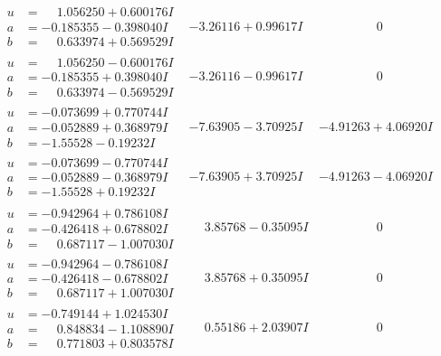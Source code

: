 \documentclass[1p]{elsarticle_modified}
\theoremstyle{definition}
\begin{document}
$$\begin{array}{c|c|c}
\begin{aligned}
u &= \phantom{-}1.056250 + 0.600176 I \\
a &= -0.185355 - 0.398040 I \\
b &= \phantom{-}0.633974 + 0.569529 I\end{aligned}
 & -3.26116 + 0.99617 I & \phantom{-0.000000 } 0 \\ \hline\begin{aligned}
u &= \phantom{-}1.056250 - 0.600176 I \\
a &= -0.185355 + 0.398040 I \\
b &= \phantom{-}0.633974 - 0.569529 I\end{aligned}
 & -3.26116 - 0.99617 I & \phantom{-0.000000 } 0 \\ \hline\begin{aligned}
u &= -0.073699 + 0.770744 I \\
a &= -0.052889 + 0.368979 I \\
b &= -1.55528 - 0.19232 I\end{aligned}
 & -7.63905 - 3.70925 I & -4.91263 + 4.06920 I \\ \hline\begin{aligned}
u &= -0.073699 - 0.770744 I \\
a &= -0.052889 - 0.368979 I \\
b &= -1.55528 + 0.19232 I\end{aligned}
 & -7.63905 + 3.70925 I & -4.91263 - 4.06920 I \\ \hline\begin{aligned}
u &= -0.942964 + 0.786108 I \\
a &= -0.426418 + 0.678802 I \\
b &= \phantom{-}0.687117 - 1.007030 I\end{aligned}
 & \phantom{-}3.85768 - 0.35095 I & \phantom{-0.000000 } 0 \\ \hline\begin{aligned}
u &= -0.942964 - 0.786108 I \\
a &= -0.426418 - 0.678802 I \\
b &= \phantom{-}0.687117 + 1.007030 I\end{aligned}
 & \phantom{-}3.85768 + 0.35095 I & \phantom{-0.000000 } 0 \\ \hline\begin{aligned}
u &= -0.749144 + 1.024530 I \\
a &= \phantom{-}0.848834 - 1.108890 I \\
b &= \phantom{-}0.771803 + 0.803578 I\end{aligned}
 & \phantom{-}0.55186 + 2.03907 I & \phantom{-0.000000 } 0 \\ \hline\begin{aligned}

\end{aligned}
\end{array}$$
\end{document}
